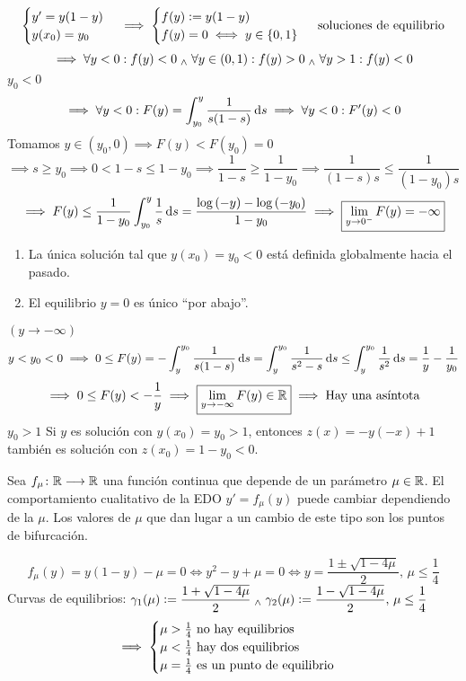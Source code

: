 \begin{ejem}
	\[\begin{cases}
		y'=y(1-y) \\
		y(x_0)=y_0
	\end{cases} \implies \begin{cases} 
		f(y)\vcentcolon= y(1-y) \\
		f(y) = 0 \iff y \in \{0, 1\} 
	\end{cases} \text{ soluciones de equilibrio}\]
	\[\implies \forall y < 0 :f(y) < 0 \; _{\wedge} \; \forall y \in (0, 1) : f(y) > 0 \; _{\wedge} \; \forall y > 1 : f(y) < 0\]
	$\boxed{y_0 < 0}$
	\[\implies \forall y < 0 : F(y)=\int_{y_0}^{y}\frac{1}{s(1-s)}\odif{s} \implies \forall y<0 : F'(y)<0\]
	Tomamos $y\in (y_0, 0) \implies F(y)<F(y_0)=0$
	\[\implies s \geq y_0 \implies 0<1-s \leq 1-y_0 \implies \frac{1}{1-s}\geq\frac{1}{1-y_0} \implies \frac{1}{(1-s)s}\leq \frac{1}{(1-y_0)s}\]
	\[\implies F(y) \leq \frac{1}{1-y_0}\int_{y_0}^{y} \frac{1}{s} \odif{s} = \frac{\log{(-y)} - \log{(-y_0)}}{1-y_0} \implies \boxed{\lim_{y\to0^-} F(y) = -\infty}\]
	\begin{enumerate}
		\item La única solución tal que $y(x_0)=y_0<0$ está definida globalmente hacia el pasado.
		\item El equilibrio $y=0$ es único ``por abajo''.
	\end{enumerate}
	$(y\to-\infty)$
	\[y<y_0<0 \implies 0 \leq F(y)=-\int_{y}^{y_0} \frac{1}{s(1-s)} \odif{s} = \int_{y}^{y_0} \frac{1}{s^2-s} \odif{s} \leq \int_{y}^{y_0} \frac{1}{s^2} \odif{s} = \frac{1}{y} -\frac{1}{y_0}\]
	\[\implies 0\leq F(y) < -\frac{1}{y} \implies \boxed{\lim_{y\to -\infty} F(y) \in \mathbb{R}} \implies \text{Hay una asíntota}\]
	$\boxed{y_0>1}$ Si $y$ es solución con $y(x_0)=y_0>1$, entonces $z(x)=-y(-x)+1$ también es solución con $z(x_0)=1-y_0<0$.
\end{ejem}


\begin{defn}[Bifurcación]
	Sea $f_\mu \colon \mathbb{R} \longrightarrow \mathbb{R}$ una función continua que depende de un parámetro $\mu \in \mathbb{R}$. El comportamiento cualitativo de la EDO $y'=f_\mu(y)$ puede cambiar dependiendo de la $\mu$. Los valores de $\mu$ que dan lugar a un cambio de este tipo son los puntos de bifurcación.
\end{defn}

\begin{ejem}[$y'=y(1-y)-\mu$]
	\[f_\mu(y)=y(1-y)-\mu=0 \iff y^2-y+\mu=0 \iff y=\frac{1\pm \sqrt{1-4\mu}}{2}, \, \mu \leq \frac{1}{4}\]
	Curvas de equilibrios: $\displaystyle \gamma_1(\mu)\vcentcolon=\frac{1+\sqrt{1-4\mu}}{2} \; _{\wedge} \; \gamma_2(\mu)\vcentcolon=\frac{1-\sqrt{1-4\mu}}{2}, \, \mu \leq \frac{1}{4}$
	\[\implies \begin{cases}
		\mu > \frac{1}{4} \text{ no hay equilibrios} \\
		\mu < \frac{1}{4} \text{ hay dos equilibrios} \\
		\mu = \frac{1}{4} \text{ es un punto de equilibrio} \\
	\end{cases}\]
\end{ejem}
